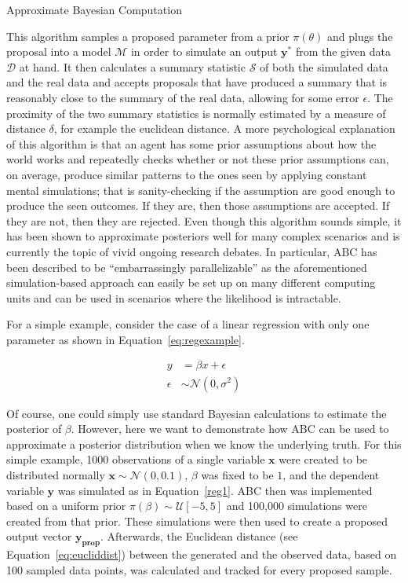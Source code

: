 \documentclass[a4paper,man, natbib]{apa6}
\begin{document}
\FloatBarrier
\begin{algorithm}
\caption{Approximate Bayesian Computation}
\label{alg:abc}

\end{algorithm}
\FloatBarrier

This algorithm samples a proposed parameter from a prior $\pi(\theta)$ and plugs the proposal into a model $\mathcal{M}$ in order to simulate an output $\mathbf{y^*}$ from the given data $\mathcal{D}$ at hand. It then calculates a summary statistic $\mathcal{S}$ of both the simulated data and the real data and accepts proposals that have produced a summary that is reasonably close to the summary of the real data, allowing for some error $\epsilon$. The proximity of the two summary statistics is normally estimated by a measure of distance $\delta$, for example the euclidean distance. A more psychological explanation of this algorithm is that an agent has some prior assumptions about how the world works and repeatedly checks whether or not these prior assumptions can, on average, produce similar patterns to the ones seen by applying constant mental simulations; that is sanity-checking if the assumption are good enough to produce the seen outcomes. If they are, then those assumptions are accepted. If they are not, then they are rejected. Even though this algorithm sounds simple, it has been shown to approximate posteriors well for many complex scenarios and is currently the topic of vivid ongoing research debates. In particular, ABC has been described to be ``embarrassingly parallelizable'' as the aforementioned simulation-based approach can easily be set up on many different computing units \citep{marjoram2003markov} and can be used in scenarios where the likelihood is intractable.

For a simple example, consider the case of a linear regression with only one parameter as shown in Equation~\ref{eq:regexample}.

\begin{align}
\label{eq:regexample}
y&=\beta x +\epsilon\\
\epsilon &\sim \mathcal{N}(0,\sigma^2)
\end{align}

Of course, one could simply use standard Bayesian calculations to estimate the posterior of $\beta$. However, here we want to demonstrate how ABC can be used to approximate a posterior distribution when we know the underlying truth. For this simple example, 1000 observations of a single variable $\mathbf{x}$ were created to be distributed normally $\mathbf{x}\sim\mathcal{N}(0,0.1)$, $\beta$ was fixed to be $1$, and the dependent variable $\mathbf{y}$ was simulated as in Equation~\ref{reg1}. ABC then was implemented based on a uniform prior $\pi(\beta)\sim\mathcal{U}[-5,5]$ and 100,000 simulations were created from that prior. These simulations were then used to create a proposed output vector $\mathbf{y_{\text{prop}}}$. Afterwards, the Euclidean distance (see Equation~\ref{eq:eucliddist}) between the generated and the observed data, based on 100 sampled data points, was calculated and tracked for every proposed sample.
\end{document}
